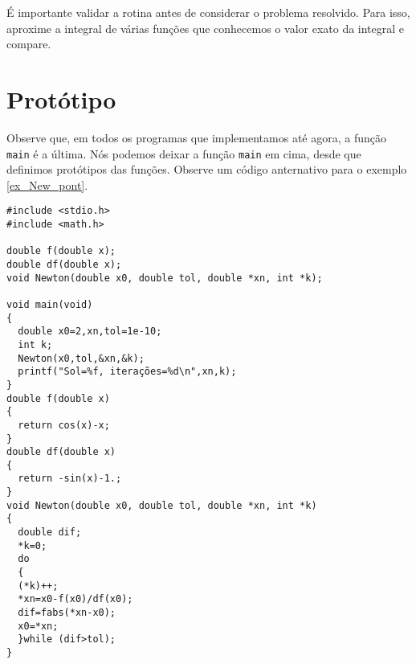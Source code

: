 É importante validar a rotina antes de considerar o problema resolvido. Para isso, aproxime a integral de várias funções que conhecemos o valor exato da integral e compare.
\section{Protótipo}
Observe que, em todos os programas que implementamos até agora, a função \verb|main| é a última. Nós podemos deixar a função \verb|main| em cima, desde que definimos protótipos das funções. Observe um código anternativo para o exemplo \ref{ex_New_pont}.
\begin{verbatim}
#include <stdio.h>
#include <math.h>

double f(double x);
double df(double x);
void Newton(double x0, double tol, double *xn, int *k);

void main(void)
{
  double x0=2,xn,tol=1e-10;
  int k;
  Newton(x0,tol,&xn,&k);
  printf("Sol=%f, iterações=%d\n",xn,k);
}
double f(double x)
{
  return cos(x)-x;
}
double df(double x)
{
  return -sin(x)-1.;
}
void Newton(double x0, double tol, double *xn, int *k)
{
  double dif;
  *k=0;
  do
  {
  (*k)++;
  *xn=x0-f(x0)/df(x0);
  dif=fabs(*xn-x0);
  x0=*xn;
  }while (dif>tol);
}
\end{verbatim}


